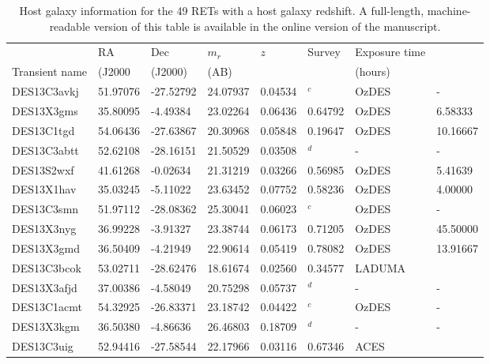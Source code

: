 \documentclass[fleqn,usenatbib,]{mnras}
\begin{document}
\begin{table}
\caption{Host galaxy information for the 49 RETs with a host galaxy redshift. A full-length, machine-readable version of this table is available in the online version of the manuscript.}

\begin{threeparttable}
\begin{tabular}{llllllll}

\toprule
{} &       RA &       Dec &    $m_r$\tnote{a}  &     $z$ &     Survey & Exposure time \tnote{b} \\
Transient name &  (J2000  & (J2000)  &  (AB)    &         &         &   (hours)         &               \\
\midrule
DES13C3avkj    & 51.97076 & -27.52792 & 24.07937 & 0.04534 &    $^c$ &      OzDES &             - \\
DES13X3gms     & 35.80095 &  -4.49384 & 23.02264 & 0.06436 & 0.64792 &      OzDES &       6.58333 \\
DES13C1tgd     & 54.06436 & -27.63867 & 20.30968 & 0.05848 & 0.19647 &      OzDES &      10.16667 \\
DES13C3abtt    & 52.62108 & -28.16151 & 21.50529 & 0.03508 &    $^d$ &          - &             - \\
DES13S2wxf     & 41.61268 &  -0.02634 & 21.31219 & 0.03266 & 0.56985 &      OzDES &       5.41639 \\
DES13X1hav     & 35.03245 &  -5.11022 & 23.63452 & 0.07752 & 0.58236 &      OzDES &       4.00000 \\
DES13C3smn     & 51.97112 & -28.08362 & 25.30041 & 0.06023 &    $^c$ &      OzDES &             - \\
DES13X3nyg     & 36.99228 &  -3.91327 & 23.38744 & 0.06173 & 0.71205 &      OzDES &      45.50000 \\
DES13X3gmd     & 36.50409 &  -4.21949 & 22.90614 & 0.05419 & 0.78082 &      OzDES &      13.91667 \\
DES13C3bcok    & 53.02711 & -28.62476 & 18.61674 & 0.02560 & 0.34577 &  LADUMA &               \\
DES13X3afjd    & 37.00386 &  -4.58049 & 20.75298 & 0.05737 &    $^d$ &          - &             - \\
DES13C1acmt    & 54.32925 & -26.83371 & 23.18742 & 0.04422 &    $^c$ &      OzDES &             - \\
DES13X3kgm     & 36.50380 &  -4.86636 & 26.46803 & 0.18709 &    $^d$ &          - &             - \\
DES13C3uig     & 52.94416 & -27.58544 & 22.17966 & 0.03116 & 0.67346 &       ACES &               \\

\end{tabular}
\end{threeparttable}
\end{table}
\end{document}
